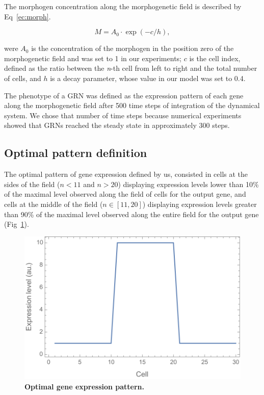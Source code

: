 \documentclass[10pt,letterpaper]{article}
\begin{document}
The morphogen concentration along the morphogenetic field is described by 
Eq~\ref{ec:morph}.

\begin{equation}
 M = A_0 \cdot \exp(-c/h),
 \label{ec:morph}
\end{equation}

were $A_0$ is the concentration of the morphogen in the position zero of the 
morphogenetic field and was set to 1 in our experiments; $c$ is the cell index, 
defined as the ratio between the \emph{n}-th cell from left to right and the 
total number of cells, and $h$ is a decay parameter, whose value in our model 
was set to 0.4.

The phenotype of a GRN was defined as the expression pattern of each gene along 
the morphogenetic field after 500 time steps of integration of the dynamical 
system. We chose that number of time steps because numerical experiments showed 
that GRNs reached the steady state in approximately 300 steps.

\subsection*{Optimal pattern definition}

The optimal pattern of gene expression defined by us, consisted in cells at the 
sides of the field ($n<11$ and $n>20$) displaying expression levels lower than 
10\% of the maximal level observed along the field of cells for the output gene,
and cells at the middle of the field ($n ∈ [11,20]$) displaying expression 
levels greater than 90\% of the maximal level observed along the entire field 
for the output gene (Fig~\ref{fig:exp-pattern}).

\begin{figure}[!h]
 \includegraphics[width=\textwidth]{figures/metodos/optimal-pattern}
 \caption{\bf Optimal gene expression pattern.}
 \label{fig:exp-pattern}
\end{figure}
\end{document}
